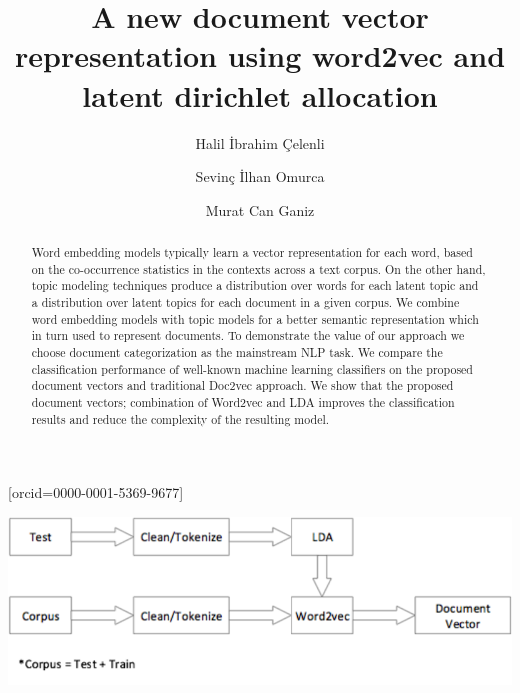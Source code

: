 \documentclass[a4paper,fleqn]{cas-dc}
\begin{document}
\let\WriteBookmarks\relax
\def\floatpagepagefraction{1}
\def\textpagefraction{.001}


\title [mode = title]{A new document vector representation using word2vec and latent dirichlet allocation} 

\author[1]{Halil \.{I}brahim \c{C}elenli}[orcid=0000-0001-5369-9677]     
\cormark[1]

\author[1]{Sevin\c{c} \.{I}lhan Omurca}
\author[2]{Murat Can Ganiz}



\address[1]{Department of Computer Engineering, Faculty of Engineering, Kocaeli University, Kocaeli, Turkey}
\address[2]{Department of Computer Engineering, Faculty of Engineering, Marmara University, İstanbul, Turkey}



\begin{abstract}
	Word embedding models typically learn a vector representation for each word, based on the co-occurrence statistics in the contexts across a text corpus. On the other hand, topic modeling techniques produce a distribution over words for each latent topic and a distribution over latent topics for each document in a given corpus. We combine word embedding models with topic models for a better semantic representation which in turn used to represent documents. To demonstrate the value of our approach we choose document categorization as the mainstream NLP task. We compare the classification performance of well-known  machine learning classifiers on the proposed document vectors and traditional Doc2vec approach. We show that the proposed document vectors; combination of Word2vec and LDA improves the classification results and reduce the complexity of the resulting model.
	
\end{abstract}

\begin{graphicalabstract}
\includegraphics{figs/fig7.pdf}
\end{graphicalabstract}
\end{document}

